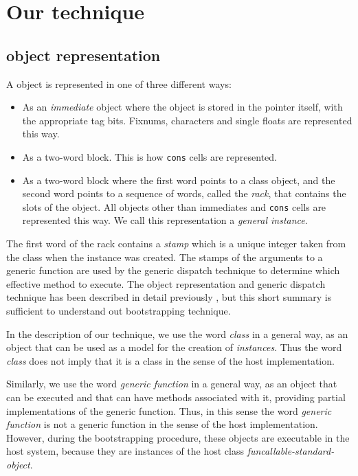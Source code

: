 \section{Our technique}
\label{sec-our-technique}

\subsection{\sicl{} object representation}

A \sicl{} object is represented in one of three different ways:

\begin{itemize}
\item As an \emph{immediate} object where the object is stored in the
  pointer itself, with the appropriate tag bits.  Fixnums, characters
  and single floats are represented this way.
\item As a two-word block.  This is how \texttt{cons} cells are
  represented.
\item As a two-word block where the first word points to a class
  object, and the second word points to a sequence of words, called
  the \emph{rack}, that contains the slots of the object.  All objects
  other than immediates and \texttt{cons} cells are represented this
  way.  We call this representation a \emph{general instance}. 
\end{itemize}

The first word of the rack contains a \emph{stamp} which is a unique
integer taken from the class when the instance was created.  The
stamps of the arguments to a generic function are used by the generic
dispatch technique to determine which effective method to execute.
The object representation and generic dispatch technique has been
described in detail previously
\cite{Strandh:2014:FGD:2635648.2635654}, but this short summary is
sufficient to understand out bootstrapping technique.

In the description of our technique, we use the word \emph{class} in a
general way, as an object that can be used as a model for the creation
of \emph{instances}.  Thus the word \emph{class} does not imply that
it is a class in the sense of the host \commonlisp{} implementation.

Similarly, we use the word \emph{generic function} in a general way,
as an object that can be executed and that can have methods associated
with it, providing partial implementations of the generic function.
Thus, in this sense the word \emph{generic function} is not a generic
function in the sense of the host \commonlisp{} implementation.
However, during the bootstrapping procedure, these objects are
executable in the host system, because they are instances of the host
class \emph{funcallable-standard-object}.

